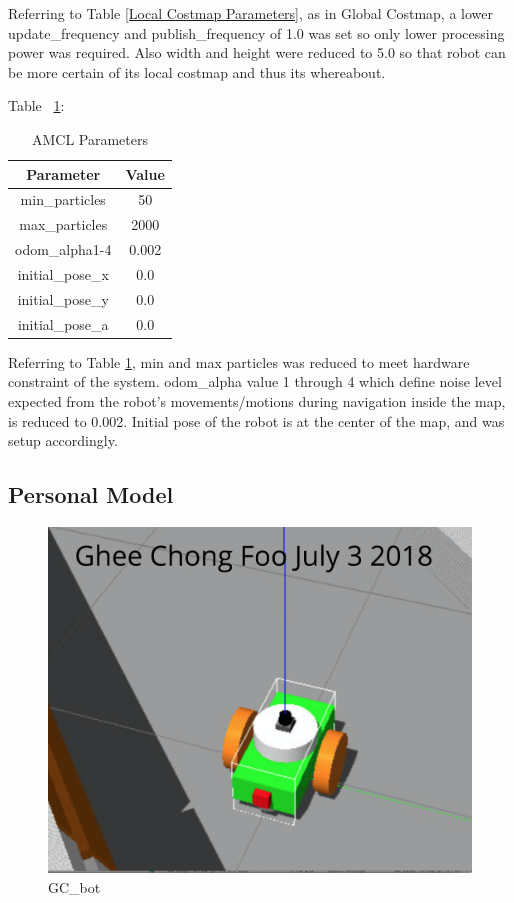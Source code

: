 \documentclass[10pt,journal,compsoc]{IEEEtran}
\begin{document}
Referring to Table \ref{Local Costmap Parameters}, as in Global Costmap, a lower update\_frequency and publish\_frequency of 1.0 was set so only lower processing power was required.  Also width and height were reduced to 5.0 so that robot can be more certain of its local costmap and thus its whereabout.

Table ~\ref{AMCL Parameters}:
\begin{table}[h]
\setlength{\tabcolsep}{1pt}  %
\caption{AMCL Parameters}
\label{AMCL Parameters}
\begin{center}
\begin{tabular}{|c||c|}
\hline
Parameter & Value\\
\hline
min\_particles & 50\\
\hline
max\_particles & 2000\\
\hline
odom\_alpha1-4 & 0.002\\
\hline
initial\_pose\_x & 0.0\\
\hline
initial\_pose\_y & 0.0\\
\hline
initial\_pose\_a & 0.0\\
\hline
\end{tabular}
\end{center}
\end{table}

Referring to Table \ref{AMCL Parameters}, min and max particles was reduced to meet hardware constraint of the system.  odom\_alpha value 1 through 4 which define noise level expected from the robot's movements/motions during navigation inside the map, is reduced to 0.002.  Initial pose of the robot is at the center of the map, and was setup accordingly.


\subsection{Personal Model}

\begin{figure}[thpb]
      \centering
      \includegraphics[width=\linewidth]{GC_bot}
      \caption{GC\_bot}
      \label{fig:GC_bot}
\end{figure}
\end{document}
